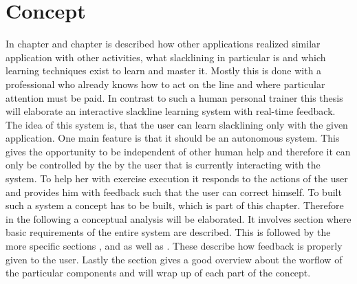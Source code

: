 \chapter{Concept}
In chapter \textit{} and \textit{} chapter is described how other applications realized similar application with other activities, what slacklining in particular is and which learning techniques exist to learn and master it. Mostly this is done with a professional who already knows how to act on the line and where particular attention must be paid. In contrast to such a human personal trainer this thesis will elaborate an interactive slackline learning system with real-time feedback. The idea of this system is, that the user can learn slacklining only with the given application. One main feature is that it should be an autonomous system. This gives the opportunity to be independent of other human help and therefore it can only 
be controlled by the by the user that is currently interacting with the system. To help her with exercise execution it responds to the actions of the user and provides him with feedback such that the user can correct himself. To built such a system a concept has to be built, which is part of this chapter. Therefore in the following a conceptual analysis will be elaborated. It involves section \textit{} where basic requirements of the entire system are described. This is followed by the more specific sections \textit{}, \textit{} and \textit{} as well as \textit{}. These describe how feedback is properly given to the user. Lastly the section \textit{} gives a good overview about the worflow of the particular components and \textit{} will wrap up of each part of the concept.






